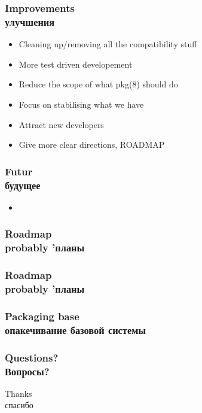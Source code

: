 \begin{frame}
	\frametitle{Improvements \\ улучшения}
	\begin{itemize}
		\item Cleaning up/removing all the compatibility stuff
		\item More test driven developement
		\item Reduce the scope of what pkg(8) should do
		\item Focus on stabilising what we have
		\item Attract new developers
		\item Give more clear directions, ROADMAP
	\end{itemize}
\end{frame}

\begin{frame}
	\frametitle{Futur \\ будущее}
	\begin{itemize}
		\item 
	\end{itemize}
\end{frame}

\begin{frame}
	\frametitle{Roadmap \\ probably 'планы}
\end{frame}

\begin{frame}
	\frametitle{Roadmap \\ probably 'планы}
\end{frame}

\begin{frame}
	\frametitle{Packaging base \\ опакечивание базовой системы}
\end{frame}

\begin{frame}[plain]
	\frametitle{Questions? \\ Вопросы?}
	\begin{center}
		\Huge Thanks
		\\
		\Huge спасибо
	\end{center}
\end{frame}


